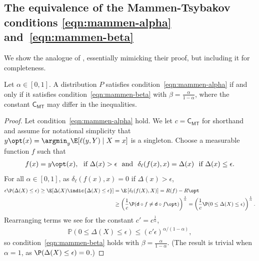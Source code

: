 \documentclass[11pt]{article}
\newcommand{\prn}[1]{\left({#1}\right)} %
\newcommand{\constant}{\mathsf{C}}  %
\newcommand{\cstMT}{\constant_{\mathsf{MT}}}
\newcommand{\pred}{\mathsf{d}}  %
\newcommand{\tloss}{\ell}  %
\newcommand{\extloss}{\delta_\tloss}
\begin{document}
\subsection{The equivalence of the Mammen-Tsybakov conditions
  \eqref{eqn:mammen-alpha} and~\eqref{eqn:mammen-beta}}
\label{sec:mammen-alpha-beta}

We show the analogue of \citet[Thm.~3]{BartlettJoMc06},
essentially mimicking their proof, but including it for completeness.
\begin{lemma}
  Let $\alpha \in [0, 1]$.
  A distribution $P$ satisfies condition~\eqref{eqn:mammen-alpha}
  if and only if it satisfies condition~\eqref{eqn:mammen-beta}
  with $\beta = \frac{\alpha}{1- \alpha}$,
  where the constant $\cstMT$ may differ in the inequalities.
\end{lemma}
\begin{proof}
  Let condition~\eqref{eqn:mammen-alpha} hold.
  We let $c = \cstMT$ for shorthand and
  assume for notational
  simplicity that $y\opt(x) = \argmin_y \E[\tloss(y, Y) \mid X = x]$ is a
  singleton.
  Choose a measurable
  function $f$ such that
  \begin{align*}
    f(x) = y\opt(x), ~~\mbox{if} ~ \Delta(x) > \epsilon
    ~~ \mbox{and} ~~
    \extloss(f(x),x) = \Delta(x)
    ~~ \mbox{if}~ \Delta(x) \leq \epsilon.
  \end{align*}
  For all $\alpha \in [0,1]$, as $\extloss(f(x), x) = 0$
  if $\Delta(x) > \epsilon$,
  \begin{align*}
    \epsilon \P(\Delta(X) \leq \epsilon)
    \geq
    \E[\Delta(X) \indic{\Delta(X) \leq \epsilon}]
    & = \E\left[\extloss(f(X),X)\right]
    = R(f) - R\opt \\
    & \geq \prn{\frac{1}{c}
      \P(\pred \circ f \neq \pred \circ f\opt)}^{\frac{1}{\alpha}}
    = \prn{\frac{1}{c} \P(0 \leq \Delta(X) \leq \epsilon)}^{\frac{1}{\alpha}}.
  \end{align*}
  Rearranging terms we see for the constant $c' = c^{\frac{1}{\alpha}}$,
  \begin{align*}
    \mathbb{P}(0 \leq \Delta(X) \leq \epsilon) \leq
    (c' \epsilon)^{\alpha/(1-\alpha)},
  \end{align*}
  so condition~\eqref{eqn:mammen-beta} holds with $\beta = \frac{\alpha}{1 -
    \alpha}$.
  (The result is trivial when $\alpha = 1$, as
  $\P(\Delta(X) \le \epsilon) = 0$.)


\end{proof}
\end{document}
